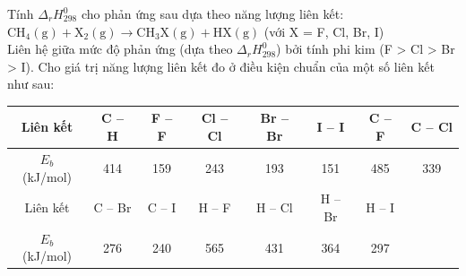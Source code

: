 \documentclass[Main.tex]{subfiles}
\begin{document}
\begin{bt}
	Tính $\Delta_rH_{298}^0$ cho phản ứng sau dựa theo năng lượng liên kết:
	$\mathrm{CH_4(g) + X_2(g) \longrightarrow CH_3X(g) + HX (g)}$ (với X = F, Cl, Br, I)
	\\
	Liên hệ giữa mức độ phản ứng (dựa theo $\Delta_rH_{298}^0$) bởi tính phi kim (F > Cl > Br > I). Cho giá trị năng lượng liên kết đo ở điều kiện chuẩn của một số liên kết như sau:
	\begin{center}
		\begin{tabular}{|c|c|c|c|c|c|c|c|}
			\hline
			Liên kết & C – H & F – F & Cl – Cl & Br – Br & I – I & C – F & C – Cl \\
			\hline
			$E_b$ (kJ/mol) & 414   & 159 & 243     & 193     & 151   & 485   & 339    \\
			\hline
			Liên kết & C – Br & C – I & H – F & H – Cl  & H – Br & H – I &        \\
			\hline
			$E_b$ (kJ/mol) & 276& 240& 565 & 431 & 364    & 297   &        \\
			\hline
		\end{tabular}
	\end{center}
\end{bt}
\end{document}
